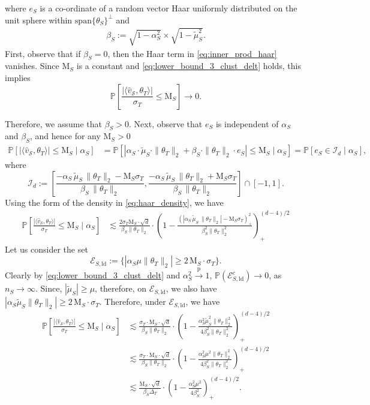 \documentclass[10pt]{article}
\newcommand{\convp}{\xrightarrow{\mathrm{p}}}
\newcommand{\wh}{\widehat}
\newcommand{\wt}{\widetilde}
\renewcommand{\sp}{\mathrm{span}}
\newcommand{\trg}{T}
\newcommand{\thetaT}{\theta_{\trg}}
\newcommand{\sigmaT}{\sigma_{\trg}}
\newcommand{\DeltaT}{\Delta_{\trg}}
\newcommand{\calS}{\mathcal S}
\newcommand{\src}{S}
\newcommand{\thetaS}{\theta_{\src}}
\newcommand{\nS}{n_{\src}}
\begin{document}
where $e_\src$ is a co-ordinate of a random vector Haar uniformly distributed on the unit sphere within $\sp\{\thetaS\}^\perp$ and 
\begin{align}
    \beta_\src:=\sqrt{1-\alpha^2_\src} \times \sqrt{1-\wt\mu_\src^2}.
\end{align}
First, observe that if $\beta_\src=0$, then the Haar term in \eqref{eq:inner_prod_haar} vanishes. Since $\mathrm M_\src$ is a constant and \eqref{eq:lower_bound_3_clust_delt} holds, this implies
\[
\mathbb P\left[\frac{|\langle \wh v_\calS,\thetaT\rangle|}{\sigmaT}\le \mathrm M_\src\right] \to 0.
\]

Therefore, we assume that $\beta_\src>0$. Next, observe that $e_\src$ is independent of $\alpha_\src$ and $\beta_\src$, and hence for any $\mathrm M_\src>0$
\begin{align}
 \mathbb P\left[|\langle \wh v_\calS,\thetaT\rangle| \le \mathrm M_\src \mid \alpha_\src\right] &= \mathbb P\left[|\alpha_\src \cdot \wt\mu_\src \cdot \|\thetaT\|_2+\beta_\src \cdot \|\thetaT\|_2 \cdot e_\src| \le \mathrm M_\src \mid \alpha_\src\right] = \mathbb P\left[e_\src \in \mathcal I_d \mid \alpha_\src\right],
\end{align}
where 
\[
\mathcal I_d:=\left[\frac{-\alpha_\src \,\wt\mu_\src\,\|\thetaT\|_2-\mathrm M_\src\sigmaT}{\beta_\src\,\|\thetaT\|_2},\frac{-\alpha_\src \,\wt\mu_\src\,\|\thetaT\|_2+\mathrm M_\src\sigmaT}{\beta_\src\,\|\thetaT\|_2}\right] \cap [-1,1].
\]
Using the form of the density in \eqref{eq:haar_density}, we have
\begin{align}
     \mathbb P\left[\frac{|\langle \wh v_\calS,\thetaT\rangle|}{\sigmaT} \le \mathrm M_\src \mid \alpha_\src\right] & \lesssim \frac{2\sigmaT\mathrm M_\src \cdot \sqrt{d}}{\beta_\src\|\thetaT\|_2} \cdot \left(1-\frac{(|\alpha_\src\,\wt\mu_\src\,\|\thetaT\|_2|-\mathrm M_\src\sigmaT)^2_+}{\beta^2_\src\|\thetaT\|^2_2}\right)^{(d-4)/2}_+
\end{align}
Let us consider the set
\[
\mathcal E_{\src,\mathrm{ld}}:=\{|\alpha_\src \mu \|\thetaT\|_2| \ge 2\,\mathrm M_\src \cdot \sigmaT\}.
\]
Clearly by \eqref{eq:lower_bound_3_clust_delt} and $\alpha^2_\src \convp 1$, $\mathbb P(\mathcal E^c_{\src,\mathrm{ld}}) \to 0$, as $\nS \to \infty$. Since, $|\wt \mu_\src| \ge \mu$, therefore, on $\mathcal E_{\src,\mathrm{ld}}$, we also have
\(
|\alpha_\src \wt\mu_\src \|\thetaT\|_2| \ge 2\,\mathrm M_\src \cdot \sigmaT.
\)
Therefore, under $\mathcal E_{\src,\mathrm{ld}}$, we have
\begin{align}
     \mathbb P\left[\frac{|\langle \wh v_\calS,\thetaT\rangle|}{\sigmaT} \le \mathrm M_\src \mid \alpha_\src\right] & \lesssim \frac{\sigmaT\cdot \mathrm M_\src \cdot \sqrt{d}}{\beta_\src\|\thetaT\|_2} \cdot \left(1-\frac{\alpha^2_\src \wt\mu^2_\src \|\thetaT\|^2_2}{4\beta^2_\src\|\thetaT\|^2_2}\right)^{(d-4)/2}_+\\
     & \lesssim \frac{\sigmaT\cdot \mathrm M_\src \cdot \sqrt{d}}{\beta_\src\|\thetaT\|_2} \cdot \left(1-\frac{\alpha^2_\src \mu^2 \|\thetaT\|^2_2}{4\beta^2_\src\|\thetaT\|^2_2}\right)^{(d-4)/2}_+\\
     & \lesssim \frac{\mathrm M_\src \cdot \sqrt{d}}{\beta_\src \DeltaT} \cdot \left(1-\frac{\alpha^2_\src \mu^2}{4\beta^2_\src}\right)^{(d-4)/2}_+.
\end{align}
\end{document}
